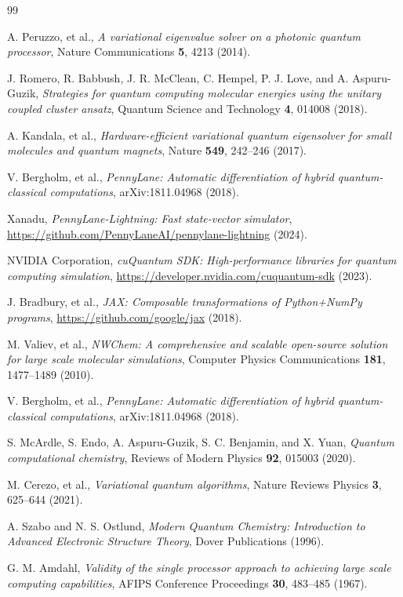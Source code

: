 \documentclass[11pt]{article}
\begin{document}
\begin{thebibliography}{99}

    A. Peruzzo, et al.,
    \textit{A variational eigenvalue solver on a photonic quantum processor},
    Nature Communications \textbf{5}, 4213 (2014).

    J. Romero, R. Babbush, J. R. McClean, C. Hempel, P. J. Love, and A. Aspuru-Guzik,
    \textit{Strategies for quantum computing molecular energies using the unitary coupled cluster ansatz},
    Quantum Science and Technology \textbf{4}, 014008 (2018).

    A. Kandala, et al.,
    \textit{Hardware-efficient variational quantum eigensolver for small molecules and quantum magnets},
    Nature \textbf{549}, 242--246 (2017).

    V. Bergholm, et al.,
    \textit{PennyLane: Automatic differentiation of hybrid quantum-classical computations},
    arXiv:1811.04968 (2018).

    Xanadu,
    \textit{PennyLane-Lightning: Fast state-vector simulator},
    \url{https://github.com/PennyLaneAI/pennylane-lightning} (2024).

    NVIDIA Corporation,
    \textit{cuQuantum SDK: High-performance libraries for quantum computing simulation},
    \url{https://developer.nvidia.com/cuquantum-sdk} (2023).

    J. Bradbury, et al.,
    \textit{JAX: Composable transformations of Python+NumPy programs},
    \url{https://github.com/google/jax} (2018).

    M. Valiev, et al.,
    \textit{NWChem: A comprehensive and scalable open-source solution for large scale molecular simulations},
    Computer Physics Communications \textbf{181}, 1477--1489 (2010).

    V. Bergholm, et al.,
    \textit{PennyLane: Automatic differentiation of hybrid quantum-classical computations},
    arXiv:1811.04968 (2018).

    S. McArdle, S. Endo, A. Aspuru-Guzik, S. C. Benjamin, and X. Yuan,
    \textit{Quantum computational chemistry},
    Reviews of Modern Physics \textbf{92}, 015003 (2020).

    M. Cerezo, et al.,
    \textit{Variational quantum algorithms},
    Nature Reviews Physics \textbf{3}, 625--644 (2021).

    A. Szabo and N. S. Ostlund,
    \textit{Modern Quantum Chemistry: Introduction to Advanced Electronic Structure Theory},
    Dover Publications (1996).

    G. M. Amdahl,
    \textit{Validity of the single processor approach to achieving large scale computing capabilities},
    AFIPS Conference Proceedings \textbf{30}, 483--485 (1967).

\end{thebibliography}
\end{document}
